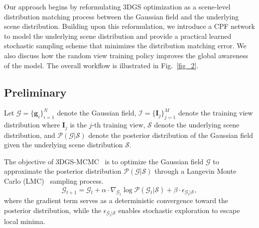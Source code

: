 \documentclass[lettersize,journal]{IEEEtran}
\begin{document}
Our approach begins by reformulating 3DGS optimization as a scene-level distribution matching process between the Gaussian field and the underlying scene distribution. 
Building upon this reformulation, we introduce a CPF network to model the underlying scene distribution and provide a practical learned stochastic sampling scheme that minimizes the distribution matching error. 
We also discuss how the random view training policy improves the global awareness of the model. The overall workflow is illustrated in Fig.~\ref{fig_2}.

\subsection{Preliminary}

Let $\mathcal{G} = \{\mathbf{g}_i\}_{i=1}^N$ denote the Gaussian field, $\mathcal{I} = \{\mathbf{I}_j\}_{j=1}^M$ denote the training view distribution where $\mathbf{I}_j$ is the $j$-th training view, $\mathcal{S}$ denote the underlying scene distribution, and 
$\mathcal{P}(\mathcal{G} \vert \mathcal{S})$ denote the posterior distribution of the Gaussian field given the underlying scene distribution $\mathcal{S}$. 

The objective of 3DGS-MCMC~\cite{mcmc} is to optimize the Gaussian field $\mathcal{G}$ to approximate the posterior distribution $\mathcal{P}(\mathcal{G} \vert \mathcal{S})$ through a Langevin Monte Carlo (LMC)~\cite{sgld} sampling process.
\begin{equation}
    \mathcal{G}_{t+1} = \mathcal{G}_t + \alpha \cdot \nabla_{\mathcal{G}_t} \log \mathcal{P}(\mathcal{G}_t \vert \mathcal{S}) + \beta \cdot \epsilon_{\mathcal{G}_t \vert \mathcal{S}}, 
    \label{eq1}
\end{equation}
where the gradient term serves as a deterministic convergence toward the posterior distribution, while the $\epsilon_{\mathcal{G}_t \vert \mathcal{S}}$ enables stochastic exploration to escape local minima.
\end{document}
